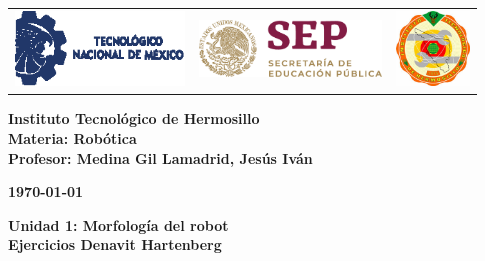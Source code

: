 \begin{titlepage}
	\centering
	\begin{tabular}{@{}p{} p{} p{}@{}}
		\includegraphics[height=2cm]{tecnm} & 
		\centering \includegraphics[height=1.5cm]{SEP} & 
		\raggedleft \includegraphics[height=2cm]{ith.jpg} \\
	\end{tabular}
	
	\vspace{2em}
	
	\noindent
	\begin{minipage}[t]{0.48\textwidth}
		\raggedright
		\small \textbf{%
			Instituto Tecnológico de Hermosillo\\
			Materia: Robótica\\
			Profesor: Medina Gil Lamadrid, Jesús Iván%
		}
	\end{minipage}%
	\hfill
	\begin{minipage}[t]{0.48\textwidth}
		\raggedleft
		\small \textbf{\today}
	\end{minipage}
	
	\vspace{2em}
	
	{\large \textbf{Unidad 1: Morfología del robot}}\\
	{\Huge \textbf{Ejercicios Denavit Hartenberg}}
	
	\vspace{1em}
	

\end{titlepage}
